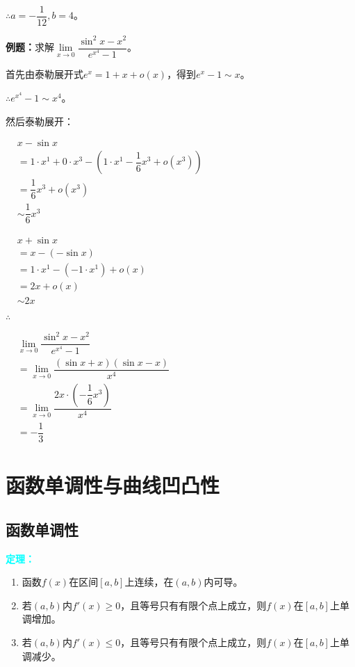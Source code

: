 \documentclass[UTF8, 12pt]{ctexart}
\begin{document}
$\therefore a=-\dfrac{1}{12},b=4$。

\textbf{例题：}求解$\lim\limits_{x\to 0}\dfrac{\sin^2x-x^2}{e^{x^4}-1}$。

首先由泰勒展开式$e^x=1+x+o(x)$，得到$e^x-1\sim x$。

$\therefore e^{x^4}-1\sim x^4$。

然后泰勒展开：

$
\begin{aligned}
    & x-\sin x \\
    & = 1\cdot x^1+0\cdot x^3 - (1\cdot x^1-\dfrac{1}{6}x^3+o(x^3)) \\
    & = \dfrac{1}{6}x^3+o(x^3) \\
    & \sim \dfrac{1}{6}x^3
\end{aligned}
$

$
\begin{aligned}
    & x+\sin x \\
    & =x-(-\sin x) \\
    & =1\cdot x^1-(-1\cdot x^1)+o(x) \\
    & =2x+o(x) \\
    & \sim 2x
\end{aligned}
$

$\therefore$ \bigskip

$
\begin{aligned}
    & \lim\limits_{x\to 0}\dfrac{\sin^2x-x^2}{e^{x^4}-1} \\
    & =\lim\limits_{x\to 0}\dfrac{(\sin x+x)(\sin x-x)}{x^4} \\
    & =\lim\limits_{x\to 0}\dfrac{2x\cdot\left(-\dfrac{1}{6}x^3\right)}{x^4} \\
    & =-\dfrac{1}{3}
\end{aligned}
$

\section{函数单调性与曲线凹凸性}

\subsection{函数单调性}

\textcolor{aqua}{\textbf{定理：}}

\begin{enumerate}
    \item 函数$f(x)$在区间$[a,b]$上连续，在$(a,b)$内可导。
    \item 若$(a,b)$内$f'(x)\geqslant 0$，且等号只有有限个点上成立，则$f(x)$在$[a,b]$上单调增加。
    \item 若$(a,b)$内$f'(x)\leqslant 0$，且等号只有有限个点上成立，则$f(x)$在$[a,b]$上单调减少。
\end{enumerate}
\end{document}

